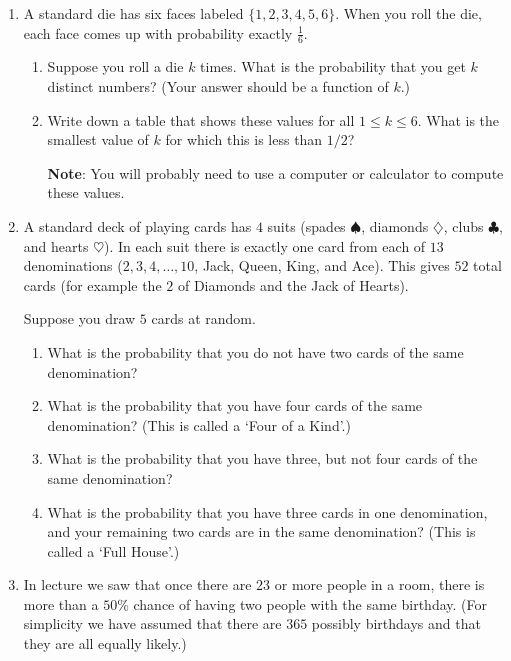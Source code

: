 \documentclass[11pt]{article}
\begin{document}
\begin{enumerate}
\item A standard die has six faces labeled $\{1,2,3,4,5,6\}$.  When you roll the die, each face comes up with probability exactly $\frac{1}{6}$.

\begin{enumerate}

\item Suppose you roll a die $k$ times.  What is the probability that you get $k$ distinct numbers? (Your answer should be a function of $k$.)


\item Write down a table that shows these values for all $1\le k \le 6$.  What is the smallest value of $k$ for which this is less than $1/2$?

{\bf Note}: You will probably need to use a computer or calculator to compute these values.

\end{enumerate}

\item A standard deck of playing cards has $4$ suits (spades $\spadesuit$, diamonds $\diamondsuit$, clubs $\clubsuit$, and hearts $\heartsuit$). In each suit there is exactly one card from each of $13$ denominations ($2,3,4,\ldots, 10$, Jack, Queen, King, and Ace).  This gives $52$ total cards (for example the $2$ of Diamonds and the Jack of Hearts).

Suppose you draw $5$ cards at random.
\begin{enumerate}
\item What is the probability that you do not have two cards of the same denomination?
\item What is the probability that you have four cards of the same denomination? (This is called a `Four of a Kind'.)
\item What is the probability that you have three, but not four cards of the same denomination? 
\item What is the probability that you have three cards in one denomination, and your remaining two cards are in the same denomination? (This is called a `Full House'.)
\end{enumerate}


\item In lecture we saw that once there are $23$ or more people in a room, there is more than a $50\%$ chance of having two people with the same birthday.  (For simplicity we have assumed that there are $365$ possibly birthdays and that they are all equally likely.)  


\end{enumerate}
\end{document}
